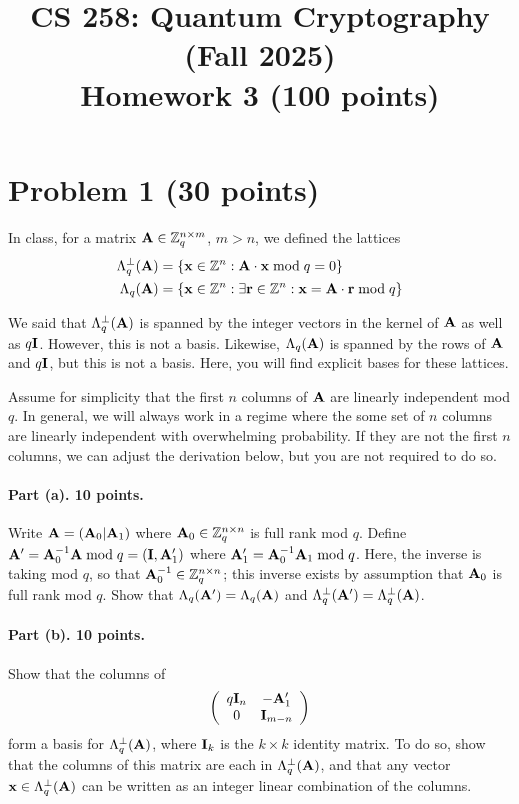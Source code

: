 \documentclass{article}
\title{CS 258: Quantum Cryptography (Fall 2025)\\ Homework 3 (100 points)}
\author{}
\date{}
\begin{document}
\maketitle

\section{Problem 1 (30 points)}

In class, for a matrix ${\mathbf{A}}\in{\mathbb{Z}}_q^{n\times m}$, $m>n$, we defined the lattices 
\begin{align*}
\Lambda_q^\perp({\mathbf{A}})&=\{{\mathbf{x}}\in{\mathbb{Z}}^n:{\mathbf{A}}\cdot{\mathbf{x}}\bmod q=0\}\\
\Lambda_q({\mathbf{A}})&=\{{\mathbf{x}}\in{\mathbb{Z}}^n:\exists{\mathbf{r}}\in{\mathbb{Z}}^n:{\mathbf{x}}={\mathbf{A}}\cdot{\mathbf{r}}\bmod q\}\end{align*}

We said that $\Lambda_q^\perp({\mathbf{A}})$ is spanned by the integer vectors in the kernel of ${\mathbf{A}}$ as well as $q{\mathbf{I}}$. However, this is not a basis. Likewise, $\Lambda_q({\mathbf{A}})$ is spanned by the rows of ${\mathbf{A}}$ and $q{\mathbf{I}}$, but this is not a basis. Here, you will find explicit bases for these lattices.

Assume for simplicity that the first $n$ columns of ${\mathbf{A}}$ are linearly independent mod $q$. In general, we will always work in a regime where the some set of $n$ columns are linearly independent with overwhelming probability. If they are not the first $n$ columns, we can adjust the derivation below, but you are not required to do so.

\paragraph{Part (a). 10 points.} Write ${\mathbf{A}}=({\mathbf{A}}_0|{\mathbf{A}}_1)$ where ${\mathbf{A}}_0\in{\mathbb{Z}}_q^{n\times n}$ is full rank mod $q$. Define ${\mathbf{A}}'={\mathbf{A}}_0^{-1}{\mathbf{A}}\bmod q=({\mathbf{I}},{\mathbf{A}}_1')$ where ${\mathbf{A}}_1'={\mathbf{A}}_0^{-1}{\mathbf{A}}_1\bmod q$. Here, the inverse is taking mod $q$, so that ${\mathbf{A}}_0^{-1}\in {\mathbb{Z}}_q^{n\times n}$; this inverse exists by assumption that ${\mathbf{A}}_0$ is full rank mod $q$. Show that $\Lambda_q({\mathbf{A}}')=\Lambda_q({\mathbf{A}})$ and $\Lambda_q^\perp({\mathbf{A}}')=\Lambda_q^\perp({\mathbf{A}})$.

\paragraph{Part (b). 10 points.} Show that the columns of 
\[\left(\begin{array}{cc}q{\mathbf{I}}_n&-{\mathbf{A}}_1'\\0&{\mathbf{I}}_{m-n}\end{array}\right)\]
form a basis for $\Lambda_q^\perp({\mathbf{A}})$, where ${\mathbf{I}}_k$ is the $k\times k$ identity matrix. To do so, show that the columns of this matrix are each in $\Lambda_q^\perp({\mathbf{A}})$, and that any vector ${\mathbf{x}}\in\Lambda_q^\perp({\mathbf{A}})$ can be written as an integer linear combination of the columns.
\end{document}
